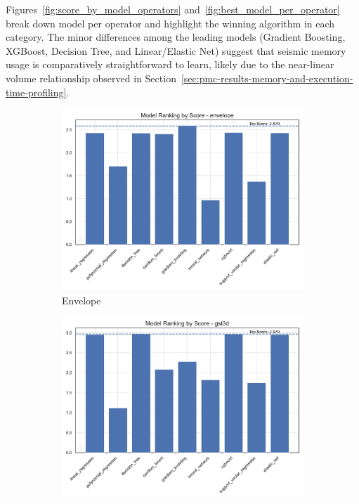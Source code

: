 Figures~\ref{fig:score_by_model_operators} and~\ref{fig:best_model_per_operator} break down model  per operator and highlight the winning algorithm in each category.
The minor differences among the leading models (Gradient Boosting, XGBoost, Decision Tree, and Linear/Elastic Net) suggest that seismic memory usage is comparatively straightforward to learn, likely due to the near-linear volume relationship observed in Section~\ref{sec:pmc-results-memory-and-execution-time-profiling}.

\begin{figure}[htbp]
    \centering
    \begin{subfigure}[t]{0.32\textwidth}
        \includegraphics[width=\textwidth]{assets/images/05/score_by_model_envelope}
        \caption{Envelope}
    \end{subfigure}
    \hfill
    \begin{subfigure}[t]{0.32\textwidth}
        \includegraphics[width=\textwidth]{assets/images/05/score_by_model_gst3d}

\end{subfigure}
\end{figure}
